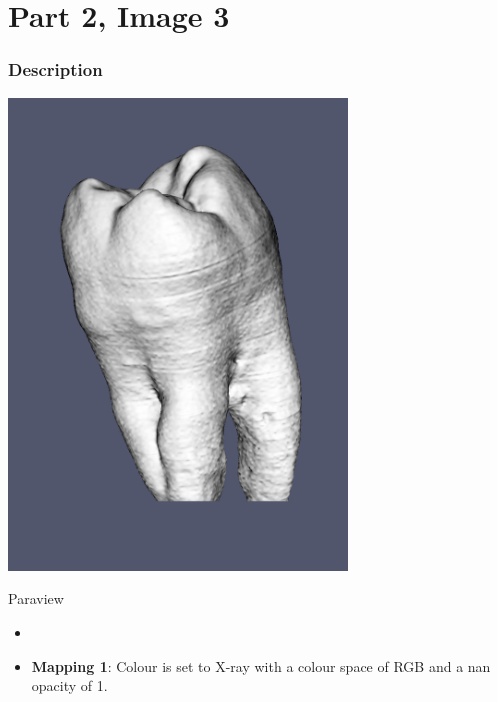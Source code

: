 \hypertarget{part-2-image-3}{%
	\section{Part 2, Image 3}\label{part-1-design-2}}

\centering


\hypertarget{description}{%
	\subsubsection{Description}\label{description}}

\begin{description}
	\item[Image:]
	
	\item\includegraphics[width=9cm]{Tooth3.png}
	
	\item[Tool:]
	\hfill \break
		Paraview
	
	\item[Visual Mappings:]
	\begin{itemize}
		\tightlist
		\item[ ]
	\end{itemize}
	
	\begin{itemize}
		\tightlist
		\item
		\textbf{Mapping 1}: 
		\hfill \break
			Colour is set to X-ray with a colour space of RGB and a nan opacity of 1.
	\end{itemize}
	

\end{description}

